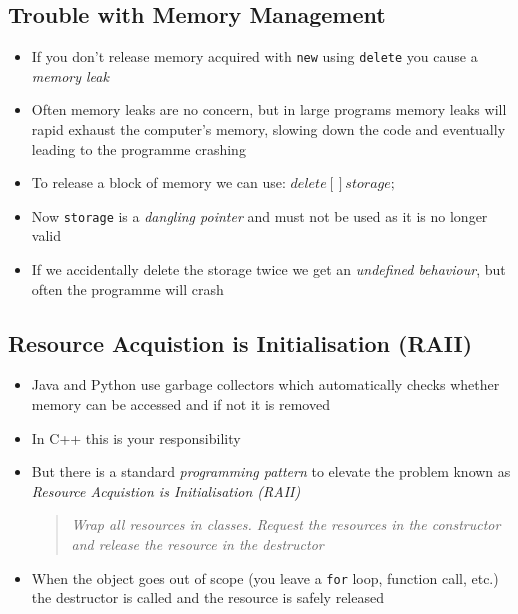 
\begin{slide}
\section[-2]{Trouble with Memory Management}

\begin{PauseHighLight}
  \begin{itemize}
  \item If you don't release memory acquired with \texttt{new} using
    \texttt{delete} you cause a \emph{memory leak}\pause
  \item Often memory leaks are no concern, but in large programs
    memory leaks will rapid exhaust the computer's memory, slowing
    down the code and eventually leading to the programme
    crashing\pause
  \item To release a block of memory we can use: \jl$delete[] storage;$\pause
  \item Now \texttt{storage} is a \emph{dangling pointer} and must not
    be used as it is no longer valid\pause
  \item If we accidentally delete the storage twice we get an
    \textit{undefined behaviour}\pause, but often the programme will crash\pause
  \end{itemize}
\end{PauseHighLight}

\end{slide}




\begin{slide}
\section{Resource Acquistion is Initialisation (RAII)}

\begin{PauseHighLight}
  \begin{itemize}
  \item Java and Python use garbage collectors which automatically
    checks whether memory can be accessed and if not it is
    removed\pause
  \item In C++ this is your responsibility\pause
  \item But there is a standard \emph{programming pattern} to elevate
    the problem known as \emph{Resource Acquistion is Initialisation
      (RAII)}\pause
    \begin{quote}
      \it Wrap all resources in classes.  Request the resources in the
      constructor and release the resource in the destructor\pause
    \end{quote}
  \item When the object goes out of scope (you leave a \texttt{for}
    loop, function call, etc.) the destructor is called and the
    resource is safely released\pause
  \end{itemize}
\end{PauseHighLight}

\end{slide}


